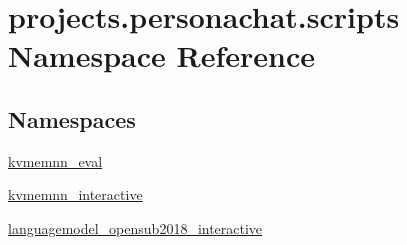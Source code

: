 \hypertarget{namespaceprojects_1_1personachat_1_1scripts}{}\section{projects.\+personachat.\+scripts Namespace Reference}
\label{namespaceprojects_1_1personachat_1_1scripts}
\subsection*{Namespaces}
\begin{DoxyCompactItemize}
\item 
 \hyperlink{namespaceprojects_1_1personachat_1_1scripts_1_1kvmemnn__eval}{kvmemnn\+\_\+eval}
\item 
 \hyperlink{namespaceprojects_1_1personachat_1_1scripts_1_1kvmemnn__interactive}{kvmemnn\+\_\+interactive}
\item 
 \hyperlink{namespaceprojects_1_1personachat_1_1scripts_1_1languagemodel__opensub2018__interactive}{languagemodel\+\_\+opensub2018\+\_\+interactive}
\end{DoxyCompactItemize}
